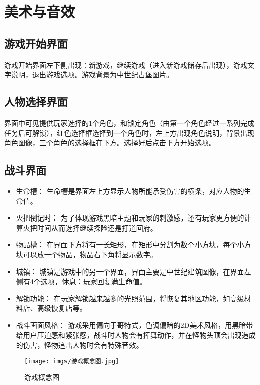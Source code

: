 \section{美术与音效}

\subsection{游戏开始界面}

游戏开始界面左下侧出现：新游戏，继续游戏（进入新游戏储存后出现），游戏文字说明，退出游戏选项。游戏背景为中世纪古堡图片。

\subsection{人物选择界面}

界面中可见提供玩家选择的1个角色，和锁定角色（由第一个角色经过一系列完成任务后可解锁），红色选择框选择到一个角色时，左上方出现角色说明，背景出现角色图像，三个角色的选择框在下方。选择好后点击下方开始选项。
\subsection{战斗界面}

\begin{itemize}
    \item 生命槽：
    生命槽是界面左上方显示人物所能承受伤害的横条，对应人物的生命值。
    \item 火把倒记时：
    为了体现游戏黑暗主题和玩家的刺激感，还有玩家更方便的计算火把时间从而选择继续探险还是打道回府。
    \item 物品槽：
    在界面下方将有一长矩形，在矩形中分割为数个小方块，每个小方块可以放一个物品，物品右下角将显示数字。
    \item 城镇：
    城镇是游戏中的另一个界面，界面主要是中世纪建筑图像，在界面左侧有4个选项，休息：玩家回复满生命值。
    \item 解锁功能：
    在玩家解锁越来越多的光照范围，将恢复其地区功能，如高级材料店、高级恢复店等。
    \item 战斗画面风格：
    游戏采用偏向于哥特式，色调偏暗的2D美术风格，用黑暗带给用户压迫感和紧张感，战斗时人物会有挥舞动作，并在怪物头顶会出现造成的伤害，怪物追击人物时会有特殊音效。
\end{itemize}

\begin{figure}[ht]
    \centering
    \texttt{[image: imgs/游戏概念图.jpg]}
    \caption{游戏概念图}
\end{figure}
